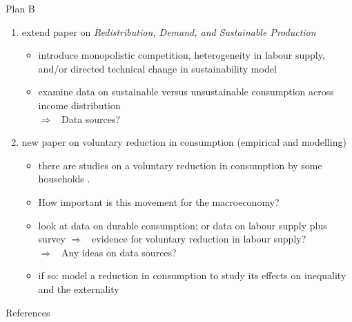 \documentclass[11pt,aspectratio=169]{beamer}
\newcommand{\ar}{$\Rightarrow$ \ }
\begin{document}


\begin{frame}{Plan B}
\begin{enumerate}
	\item extend paper on \textit{Redistribution, Demand, and Sustainable Production}
	\begin{itemize}
\item introduce monopolistic competition, heterogeneity in labour supply, and/or directed technical change in sustainability model
\item examine data on sustainable versus unsustainable consumption across income distribution  \\
\alert{\ar Data sources?}
	\end{itemize}
\item new paper on voluntary reduction in consumption (empirical and modelling)
\begin{itemize}
	\item there are studies on a voluntary reduction in consumption by some households \citep{Alexander2012TheContext}. 
	\item How important is this movement for the macroeconomy?
\item look at data on durable consumption; or data on labour supply plus survey \ar evidence for voluntary reduction in labour supply?\\
\alert{\ar Any ideas on data sources?}
\item if so: model a reduction in consumption to study its effects on inequality and the externality
\end{itemize}
\end{enumerate}
\end{frame}
\begin{frame}[allowframebreaks]{References}
	
	
	
\end{frame}
\end{document}
